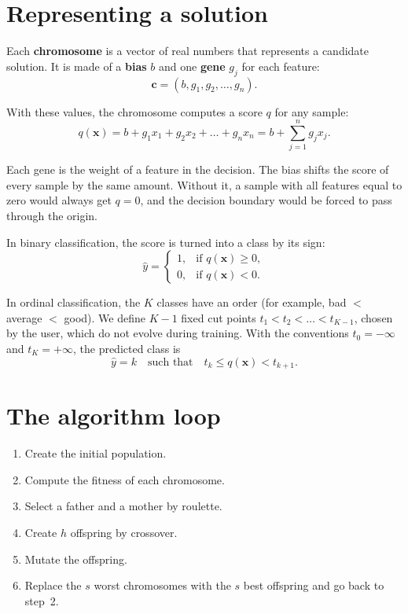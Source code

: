 \documentclass[11pt,a4paper]{article}
\newcommand{\chrom}{\mathbf{c}}
\begin{document}
\section{Representing a solution}

Each \textbf{chromosome} is a vector of real numbers that represents a candidate
solution. It is made of a \textbf{bias} $b$ and one \textbf{gene} $g_j$ for each
feature:
\begin{equation}
  \chrom = (b, g_1, g_2, \dots, g_n).
\end{equation}

With these values, the chromosome computes a score $q$ for any sample:
\begin{equation}
  q(\mathbf{x}) = b + g_1 x_1 + g_2 x_2 + \dots + g_n x_n
                = b + \sum_{j=1}^{n} g_j x_j.
  \label{eq:score}
\end{equation}

Each gene is the weight of a feature in the decision. The bias shifts the score of
every sample by the same amount. Without it, a sample with all features equal to zero
would always get $q = 0$, and the decision boundary would be forced to pass through
the origin.

In binary classification, the score is turned into a class by its sign:
\begin{equation}
  \hat{y} =
  \begin{cases}
    1, & \text{if } q(\mathbf{x}) \geq 0,\\
    0, & \text{if } q(\mathbf{x}) < 0.
  \end{cases}
  \label{eq:binary}
\end{equation}

In ordinal classification, the $K$ classes have an order (for example,
bad $<$ average $<$ good). We define $K-1$ fixed cut points
$t_1 < t_2 < \dots < t_{K-1}$, chosen by the user, which do not evolve during
training. With the conventions $t_0 = -\infty$ and $t_K = +\infty$, the predicted
class is
\begin{equation}
  \hat{y} = k \quad \text{such that} \quad t_k \leq q(\mathbf{x}) < t_{k+1}.
  \label{eq:ordinal}
\end{equation}

\section{The algorithm loop}

\begin{enumerate}[nosep]
  \item Create the initial population.
  \item Compute the fitness of each chromosome.
  \item Select a father and a mother by roulette.
  \item Create $h$ offspring by crossover.
  \item Mutate the offspring.
  \item Replace the $s$ worst chromosomes with the $s$ best offspring and go back to step~2.
\end{enumerate}
\end{document}
